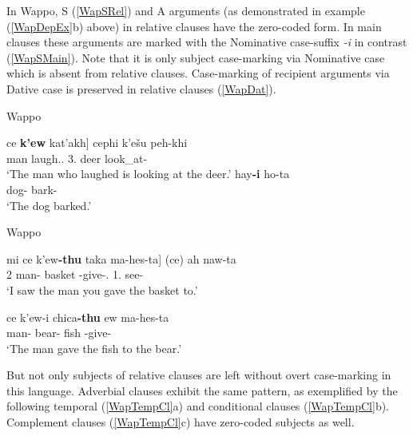 In  Wappo, S (\ref{WapSRel}) and A arguments (as demonstrated in example (\ref{WapDepEx}b) above)  in relative clauses have the zero-coded form. 
In main clauses these arguments are marked with the Nominative case-suffix \emph{-i} in contrast (\ref{WapSMain}).
Note that it is only subject case-marking via Nominative case which is absent from relative clauses. 
Case-marking of recipient arguments via Dative case is preserved in relative clauses (\ref{WapDat}).

\begin{exe} \ex\label{WapRelS} {Wappo} \citep[Wappo-Yukian; California; ][117, 41]{Thompsonetal:2006}\nopagebreak[4]
\begin{xlist} 
\ex\label{WapSRel} \gll  {\rm[}ce \textbf{k'ew} kat'akh{\rm]} cephi k'e\v su peh-khi\textglotstop\\
\dem{} man laugh.\stat{}.\dep{} 3\sg{}.\nom{} deer look\_at-\stat{}\\
`The man who laughed is looking at the deer.' %
\ex\label{WapSMain} \gll hay\textbf{-i} ho\textglotstop -ta\textglotstop\\
dog-\nom{} bark-\pst{}\\
`The dog barked.' %
\end{xlist}
\end{exe}

\enlargethispage{\baselineskip}

\begin{exe}\ex\label{WapDat} {Wappo} \citep[117, 12]{Thompsonetal:2006}\nopagebreak[4]
\begin{xlist} 
\ex\label{WapDatRel}\gll  {\rm[}mi ce k'ew\textbf{-thu} {taka\textglotstop} ma-hes-ta{\rm]} (ce) ah naw-ta\textglotstop\\
2\sg{} \dem{} man-\dat{} basket \dir{}-give-\pst{}.\dep{} \dem{} 1\sg{}.\nom{} see-\pst{}\\
`I saw the man you gave the basket to.' %

\ex\label{WapDatMain}\gll ce k'ew-i chica\textbf{-thu}  ew ma-hes-ta\textglotstop\\
\dem{} man-\nom{} bear-\dat{} fish \dir{}-give-\pst{}\\
`The man gave the fish to the bear.' %
\end{xlist}
\end{exe}

But not only subjects of relative clauses are left without overt case-marking in this language.
Adverbial clauses exhibit the same pattern, as exemplified by the following  temporal (\ref{WapTempCl}a) and conditional clauses (\ref{WapTempCl}b). 
Complement clauses (\ref{WapTempCl}c) have zero-coded subjects as well.

